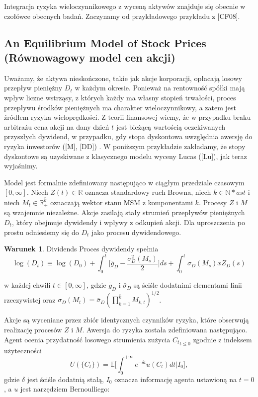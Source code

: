 \documentclass[12pt]{article}
\theoremstyle{definition}
\newtheorem{war}{Warunek}[section]
\begin{document}
Integracja ryzyka wieloczynnikowego z wyceną aktywów znajduje się obecnie w czołówce obecnych badań. Zaczynamy od przykładowego przykładu z [CF08].

\subsection{An Equilibrium Model of Stock Prices \\(Równowagowy model cen akcji)}

Uważamy, że aktywa nieskończone, takie jak akcje korporacji, opłacają losowy przepływ pieniężny $D_t$ w każdym okresie. Ponieważ na rentowność spółki mają wpływ liczne wstrząsy, z których każdy ma własny stopień trwałości, proces przepływu środków pieniężnych ma charakter wieloczynnikowy, a zatem jest źródłem ryzyka wieloprędkości. Z teorii finansowej wiemy, że w przypadku braku arbitrażu cena akcji na dany dzień $t$ jest bieżącą wartością oczekiwanych przyszłych dywidend, w przypadku, gdy stopa dyskontowa uwzględnia awersję do ryzyka inwestorów ([M], [DD]) . W poniższym przykładzie zakładamy, że stopy dyskontowe są uzyskiwane z klasycznego modelu wyceny Lucas ([Lu]), jak teraz wyjaśnimy.

Model jest formalnie zdefiniowany następująco w ciągłym przedziale czasowym $[0, \infty]$. Niech $Z(t)\in \mathbb{R}$ oznacza standardowy ruch Browna, niech $\bar{k}\in \mathbb{N}*{ast}$ i niech $M_t \in \mathbb{R}^{\bar{k}}_{+}$ oznaczają wektor stanu MSM z komponentami $\bar{k}$. Procesy $Z$ i $M$ są wzajemnie niezależne. Akcje zasilają stały strumień przepływów pieniężnych $D_t$, który obejmuje dywidendy i wpływy z odkupień akcji. Dla uproszczenia po prostu odniesiemy się do $D_t$ jako procesu dywidendowego.
\begin{war}{Dividends} Proces dywidendy spełnia
$$\log(D_t) \equiv \log(D_0)+ \int_{0}^{t} \bigg[\bar{g}_D - \frac{\sigma^{2}_{D} (M_s)}{2} \bigg]ds  + \int_{0}^{t} \sigma_D (M_s)xZ_D(s)$$
\end{war}
w każdej chwili $t \in [0, \infty]$, gdzie $\bar{g}_D$ i $\bar{\sigma}_D$ są ściśle dodatnimi elementami linii rzeczywistej oraz $\sigma_D(M_t) = \bar{\sigma}_D(\prod_{k=1}^{\bar{k}} M_{k,t})^{1/2}$.

Akcje są wyceniane przez zbiór identycznych czynników ryzyka, które obserwują realizację procesów $Z$ i $M$. Awersja do ryzyka została zdefiniowana następująco. Agent ocenia przydatność losowego strumienia zużycia ${C_t}_{t \leq 0}$ zgodnie z indeksem użyteczności
$$U(\{ C_t\}) = \mathbb{E} \bigg[ \int_{0}^{+\infty} e^{-\delta t} u(C_t)dt \bigg| I_0 \bigg],$$
gdzie $\delta$ jest ściśle dodatnią stałą, $I_0$ oznacza informację agenta ustawioną na $t = 0$, a $u$ jest narzędziem Bernoulliego:
\end{document}

